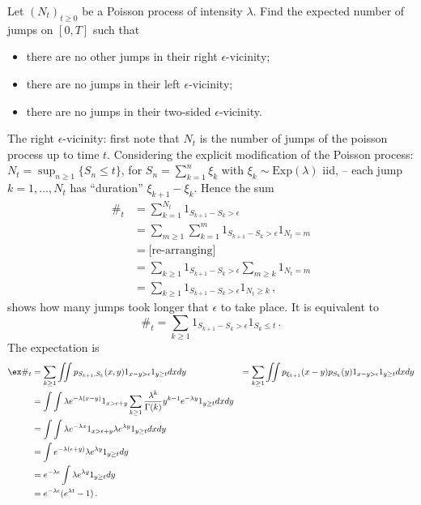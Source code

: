 Let $(N_t)_{t\geq 0}$ be a Poisson process of intensity $\lambda$. Find the expected
number of jumps on $[0,T]$ such that \begin{itemize}
	\item there are no other jumps in their right $\epsilon$-vicinity;
	\item there are no jumps in their left $\epsilon$-vicinity;
	\item there are no jumps in their two-sided $\epsilon$-vicinity.
\end{itemize}
The right $\epsilon$-vicinity: first note that $N_t$ is the number of jumps of
the poisson process up to time $t$. Considering the explicit modification of the
Poisson process: $N_t = \sup_{n\geq1} \{S_n\leq t\}$, for $S_n=\sum_{k=1}^n\xi_k$
with $\xi_k\sim\text{Exp}(\lambda)$ iid, -- each jump $k=1,\ldots,N_t$ has
``duration'' $\xi_{k+1}-\xi_k$. Hence the sum
\begin{align*}
	\#_t &= \sum_{k=1}^{N_t} 1_{ S_{k+1} - S_k > \epsilon }\\
		&= \sum_{m\geq 1} \sum_{k=1}^m 1_{ S_{k+1}-S_k > \epsilon }1_{N_t=m} \\
		&= \bigl[\text{re-arranging}\bigr] \\
		&= \sum_{k\geq 1} 1_{ S_{k+1}-S_k > \epsilon } \sum_{m\geq k} 1_{N_t=m}\\
		&= \sum_{k\geq 1} 1_{ S_{k+1}-S_k > \epsilon } 1_{N_t\geq k} \,,
\end{align*}
shows how many jumps took longer that $\epsilon$ to take place. It is equivalent
to
\[ \#_t = \sum_{k\geq 1} 1_{ S_{k+1}-S_k > \epsilon } 1_{S_k\leq t} \,. \]
The expectation is
\begin{align*}
	\ex \#_t
	&= \sum_{k\geq1} \iint p_{S_{k+1},S_k}(x,y) 1_{x-y>\epsilon}1_{y\geq t}dxdy
	&= \sum_{k\geq1} \iint p_{\xi_{k+1}}(x-y) p_{S_k}(y) 1_{x-y>\epsilon}1_{y\geq t} dxdy \\
	&= \int \int \lambda e^{-\lambda(x-y)} 1_{x>\epsilon+y}
		\sum_{k\geq1} \frac{\lambda^k}{\Gamma(k)} y^{k-1}e^{-\lambda y} 1_{y\geq t} dxdy \\
	&= \int \int \lambda e^{-\lambda x} 1_{x>\epsilon+y} \lambda e^{\lambda y} 1_{y\geq t} dxdy \\
	&= \int e^{-\lambda (\epsilon + y)} \lambda e^{\lambda y} 1_{y\geq t} dy \\
	&= e^{-\lambda \epsilon} \int \lambda e^{\lambda y} 1_{y\geq t} dy \\
	&= e^{-\lambda \epsilon} (e^{\lambda t} - 1) \,.
\end{align*}

